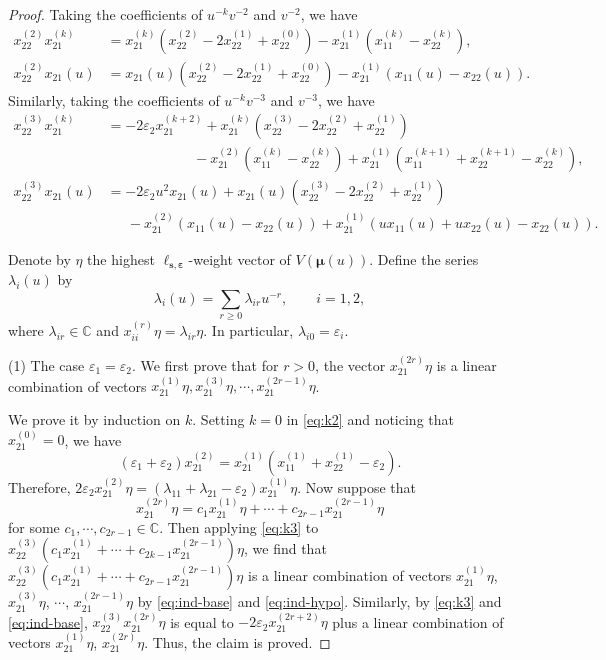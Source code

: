 \documentclass[11pt,reqno]{amsart}
\numberwithin{equation}{section}
\theoremstyle{definition}
\theoremstyle{remark}
\newcommand{\beq}{\begin{equation}}
\newcommand{\eeq}{\end{equation}}
\newcommand{\bC}{\mathbb{C}}
\newcommand{\gge}{\geqslant}
\newcommand{\la}{\lambda}
\newcommand{\ve}{\varepsilon}
\newcommand{\s}{{\bm s}}
\begin{document}
\begin{proof}
Taking the coefficients of $u^{-k}v^{-2}$ and $v^{-2}$, we have
\begin{align}
x^{(2)}_{22}x_{21}^{(k)}&=x_{21}^{(k)}(x_{22}^{(2)}-2x_{22}^{(1)}+x_{22}^{(0)})-x_{21}^{(1)}(x_{11}^{(k)}-x_{22}^{(k)}),\label{eq:k2}\\
x^{(2)}_{22}x_{21}(u)&=x_{21}(u)(x_{22}^{(2)}-2x_{22}^{(1)}+x_{22}^{(0)})-x_{21}^{(1)}(x_{11}(u)-x_{22}(u)).\label{eq:just2}
\end{align}
Similarly, taking the coefficients of $u^{-k}v^{-3}$ and $v^{-3}$, we have
\begin{align}
x^{(3)}_{22}x_{21}^{(k)}&=-2\ve_2x_{21}^{(k+2)}+x_{21}^{(k)}(x_{22}^{(3)}-2x_{22}^{(2)}+x_{22}^{(1)})\nonumber \\ &\qquad\qquad\qquad\,  -x_{21}^{(2)}(x_{11}^{(k)}-x_{22}^{(k)})+x_{21}^{(1)}(x_{11}^{(k+1)}+x_{22}^{(k+1)}-x_{22}^{(k)}),\label{eq:k3}\\
x^{(3)}_{22}x_{21}(u)&=-2\ve_2u^2x_{21}(u)+x_{21}(u)(x_{22}^{(3)}-2x_{22}^{(2)}+x_{22}^{(1)})\nonumber\\&\quad \ \  -x_{21}^{(2)}(x_{11}(u)-x_{22}(u))+x_{21}^{(1)}(ux_{11}(u)+ux_{22}(u)-x_{22}(u)).\label{eq:just3}
\end{align}

Denote by $\eta$ the highest $\ell_{\s,\bm\ve}$-weight vector of $V(\bm\mu(u))$.  Define the series $\la_i(u)$ by
\[
\la_i(u)=\sum_{r\gge 0} \la_{ir}u^{-r},\qquad i=1,2,
\]
where $\la_{ir}\in\bC$ and $x_{ii}^{(r)}\eta=\la_{ir}\eta$. In particular, $\la_{i0}=\ve_i$.

(1) The case $\ve_1=\ve_2$. We first prove that for $r>0$, the vector $x_{21}^{(2r)}\eta$ is a linear combination of vectors $x_{21}^{(1)}\eta,x_{21}^{(3)}\eta,\cdots,x_{21}^{(2r-1)}\eta$.

We prove it by induction on $k$. Setting $k=0$ in \eqref{eq:k2} and noticing that $x_{21}^{(0)}=0$, we have
\beq\label{eq:ind-base}
(\ve_1+\ve_2)x_{21}^{(2)}=x_{21}^{(1)}(x_{11}^{(1)}+x_{22}^{(1)}-\ve_2).
\eeq
Therefore, $2\ve_2x_{21}^{(2)}\eta=(\la_{11}+\la_{21}-\ve_2)x_{21}^{(1)}\eta$. Now suppose that
\beq\label{eq:ind-hypo}
x_{21}^{(2r)}\eta=c_1x_{21}^{(1)}\eta+\cdots+c_{2r-1}x_{21}^{(2r-1)}\eta
\eeq
for some $c_1,\cdots,c_{2r-1}\in\bC$. Then applying \eqref{eq:k3} to $x_{22}^{(3)}(c_1x_{21}^{(1)}+\cdots+c_{2k-1}x_{21}^{(2r-1)})\eta$, we find that $x_{22}^{(3)}(c_1x_{21}^{(1)}+\cdots+c_{2r-1}x_{21}^{(2r-1)})\eta$ is a linear combination of vectors $x_{21}^{(1)}\eta$, $x_{21}^{(3)}\eta$, $\cdots$, $x_{21}^{(2r-1)}\eta$ by \eqref{eq:ind-base} and \eqref{eq:ind-hypo}. Similarly, by \eqref{eq:k3} and \eqref{eq:ind-base}, $x_{22}^{(3)}x_{21}^{(2r)}\eta$ is equal to $-2\ve_2x_{21}^{(2r+2)}\eta$ plus a linear combination of vectors $x_{21}^{(1)}\eta$, $x_{21}^{(2r)}\eta$. Thus, the claim is proved.


\end{proof}
\end{document}

